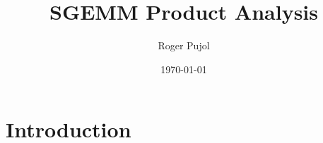 \documentclass[sigconf,authorversion]{acmart}
\title{SGEMM Product Analysis}
\author{Roger Pujol}
\affiliation{%
  \institution{Universitat Politècnica de Catalunya (UPC)}
  \city{Barcelona}
  \country{Spain}}
\date{\today}
\begin{document}
\maketitle

\section{Introduction}
\end{document}
